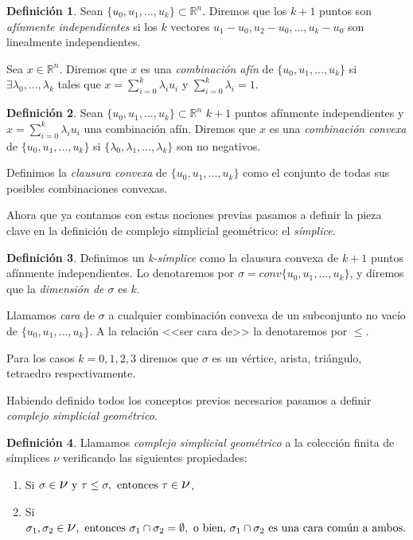 \documentclass[12pt, a4paper, twoside]{book}
\numberwithin{equation}{section}
\theoremstyle{definition}
\newtheorem{defi}{Definición}[section]
\theoremstyle{remark}
\theoremstyle{plain}
\begin{document}
	\begin{defi}
		Sean $\{u_{0},u_{1},...,u_{k}\}\subset\mathbb{R}^{n}$. Diremos
		que los $k+1$ puntos son \textit{afínmente independientes} si 
		los $k$ vectores $u_{1}-u_{0},u_{2}-u_{0},...,u_{k}-u_{0}$ son
		linealmente independientes.

		Sea $x \in \mathbb{R}^{n}$. Diremos que $x$ es una 
		\textit{combinación afín} de $\{u_{0},u_{1},...,u_{k}\}$ si 
		$\exists \lambda_{0},...,\lambda_{k}$ tales que 
		$x=\sum_{i=0}^{k}\lambda_{i}u_{i}$ y 
		$\sum_{i=0}^{k}\lambda_{i}=1$.
	\end{defi}

	\begin{defi}
		Sean $\{u_{0},u_{1},...,u_{k}\}\subset\mathbb{R}^{n}$ $k+1$ 
		puntos afínmente independientes y $x=\sum_{i=0}^{k}
		\lambda_{i}u_{i}$ una combinación afín. Diremos que $x$ es una
		\textit{combinación convexa} de $\{u_{0},u_{1},...,u_{k}\}$ si 
		$\{\lambda_{0},\lambda_{1},...,\lambda_{k}\}$ son 
		no negativos.

		Definimos la \textit{clausura convexa} de $\{u_{0},u_{1},...,
		u_{k}\}$ como el conjunto de todas sus posibles combinaciones 
		convexas.
	\end{defi}

	Ahora que ya contamos con estas nociones previas pasamos a definir la 
	pieza clave en la definición de complejo simplicial geométrico: el 
	\emph{símplice}.

	\begin{defi}
		Definimos un \textit{k-símplice} como la clausura convexa de 
		$k+1$ puntos afínmente independientes. Lo denotaremos por 
		$\sigma=conv\{u_{0},u_{1},...,u_{k}\}$, y diremos que la 
		\textit{dimensión de $\sigma$} es $k$.

		Llamamos \textit{cara} de $\sigma$ a cualquier combinación 
		convexa de un subconjunto no vacío de $\{u_{0},u_{1},...,
		u_{k}\}$. A la relación <<ser cara de>> la denotaremos por 
		$\leq$.

		Para los casos $k=0,1,2,3$ diremos que $\sigma$ es un vértice,
		arista, triángulo, tetraedro respectivamente.
	\end{defi}

	Habiendo definido todos los conceptos previos necesarios pasamos a 
	definir \emph{complejo simplicial geométrico}.

	\begin{defi}
		Llamamos \textit{complejo simplicial geométrico} a la 
		colección finita de símplices {\Large $\nu$} verificando las
		siguientes propiedades:
		\begin{enumerate}
			\item Si $\sigma\in \text{{\Large $\nu$} y }
				\tau \leq \sigma, \text{ entonces }  \tau \in 
				\text{{\Large $\nu$}}$,
			\item Si $\sigma_{1},\sigma_{2} \in 
				\text{{\Large $\nu$}}, \text{ entonces } 
				\sigma_{1}\cap\sigma_{2}=\emptyset, 
				\text{ o bien, }
				\sigma_{1}\cap\sigma_{2} \text{ es una cara 
				común a ambos.}$
		\end{enumerate}
	\end{defi}
	
\end{document}
